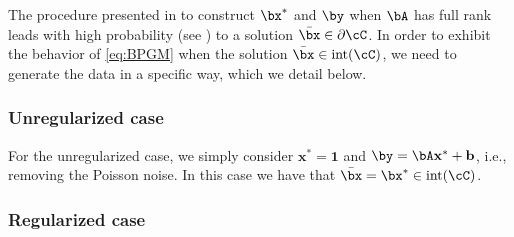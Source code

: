 \documentclass[11pt]{amsart}
\begin{document}
The procedure presented in  to construct $\bx^*$ and $\by$ when $\bA$ has full rank leads with high probability (see ) to a solution $\bar{\bx} \in \partial \cC$. In order to exhibit the behavior of \eqref{eq:BPGM} when the solution $\bar{\bx} \in \mathrm{int}(\cC)$, we need to generate the data in a specific way, which we detail below.

\subsubsection{Unregularized case}
\label{app: generation sol in int C in unreg case}

For the unregularized case, we simply consider $\mathbf{x}^* = \mathbf{1} $ and $\by = \bA \mathbf{x}^* + \mathbf{b}$, i.e., removing the Poisson noise. In this case we have that $\bar{\bx} = \bx^* \in \operatorname{int}(\cC)$.

\subsubsection{Regularized case} 
\label{app: generation sol in int C in reg case}
\end{document}
